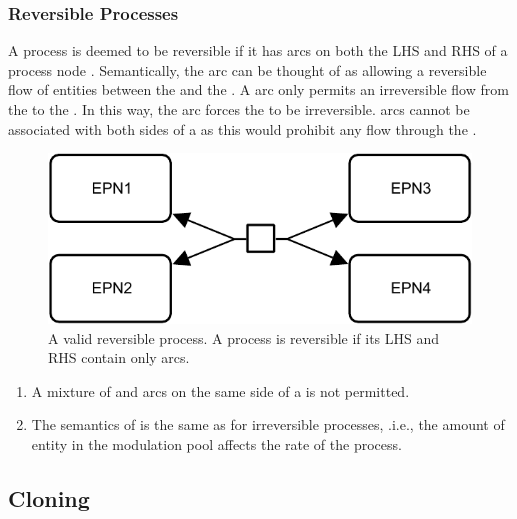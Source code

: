 \subsubsection{Reversible Processes}
\label{sec: semantics reversible procs}

A process is deemed to be reversible if it has  arcs on both the LHS and RHS of a process node . Semantically, the  arc can be thought of as allowing a reversible flow of entities between the  and the . A  arc only permits an irreversible flow from the  to the . In this way, the  arc forces the  to be irreversible.  arcs cannot be associated with both sides of a  as this would prohibit any flow through the .

\begin{figure}[H]
  \centering
  \includegraphics[scale = 0.8]{images/build/reversible_process.pdf}
  \caption{A valid reversible process. A process is reversible if its LHS and RHS contain only  arcs.}
  \label{fig:process-reversibility}
\end{figure}
 
\begin{enumerate}
\item  A mixture of  and  arcs on the same side of a  is not permitted.

\item The semantics of  is the same as for irreversible processes, .i.e., the amount of entity in the modulation pool affects the rate of the process.
\end{enumerate}

 
\subsection{Cloning}


